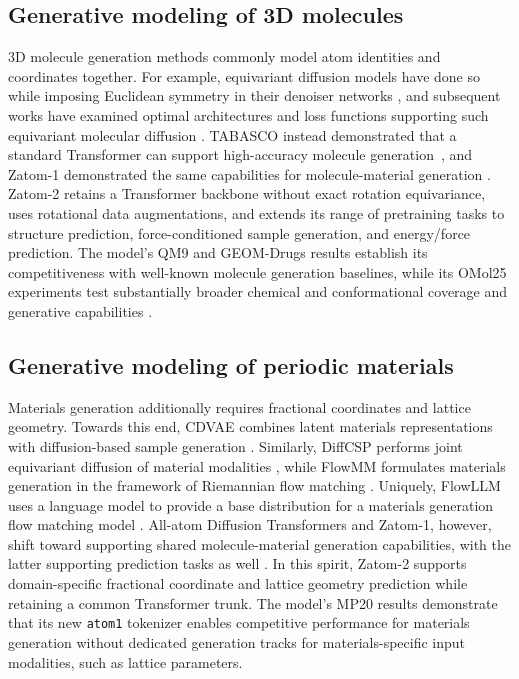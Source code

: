 \documentclass{article} %
\begin{document}
\subsection{Generative modeling of 3D molecules}

3D molecule generation methods commonly model atom identities and coordinates together. For example, equivariant diffusion models have done so while imposing Euclidean symmetry in their denoiser networks \citep{hoogeboom2022equivariant}, and subsequent works have examined optimal architectures and loss functions supporting such equivariant molecular diffusion \citep{vignac2023midi,le2024navigating,irwin2025semlaflow}. TABASCO instead demonstrated that a standard Transformer can support high-accuracy molecule generation~\citep{tabasco}, and Zatom-1 demonstrated the same capabilities for molecule-material generation \citep{morehead2026zatom1}. Zatom-2 retains a Transformer backbone without exact rotation equivariance, uses rotational data augmentations, and extends its range of pretraining tasks to structure prediction, force-conditioned sample generation,
and energy/force prediction. The model's QM9 and GEOM-Drugs results establish its competitiveness with well-known molecule generation baselines, while its OMol25 experiments test substantially broader chemical and conformational coverage and generative capabilities \citep{ramakrishnan2014quantum,levine2025omol25}.

\subsection{Generative modeling of periodic materials}

Materials generation additionally requires fractional coordinates and lattice geometry. Towards this end, CDVAE combines latent materials representations with diffusion-based sample generation \citep{xie2022crystal}. Similarly, DiffCSP performs joint equivariant diffusion of material modalities \citep{jiao2023crystal}, while FlowMM formulates materials generation in the framework of Riemannian flow matching \citep{miller2024flowmm}. Uniquely, FlowLLM uses a language model to provide a base distribution for a materials generation flow matching model \citep{sriram2024flowllm}. All-atom Diffusion Transformers and Zatom-1, however, shift toward supporting shared molecule-material generation capabilities, with the latter supporting prediction tasks as well \citep{joshi2025allatom,morehead2026zatom1}. In this spirit, Zatom-2 supports domain-specific fractional coordinate and lattice geometry prediction while retaining a common Transformer trunk. The model's MP20 results demonstrate that its new \texttt{atom1} tokenizer enables competitive performance for materials generation without dedicated generation tracks for materials-specific input modalities, such as lattice parameters.
\end{document}
